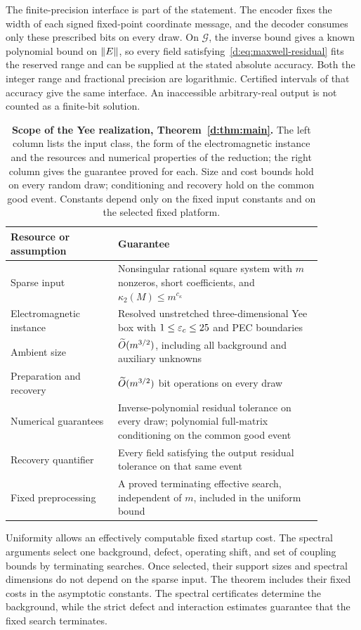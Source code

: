 The finite-precision interface is part of the statement. The encoder fixes
the width of each signed fixed-point coordinate message, and the decoder
consumes only these prescribed bits on every draw. On $\mathcal G$, the
inverse bound gives a known polynomial bound on $\left\lVert E\right\rVert$, so every
field satisfying~\eqref{d:eq:maxwell-residual} fits the reserved range and can be supplied at the stated
absolute accuracy. Both the integer range and fractional precision are
logarithmic. Certified intervals of that accuracy give the same interface.
An inaccessible arbitrary-real output is not counted as a finite-bit solution.

\begin{table}[tb]
\centering
\caption{\textbf{Scope of the Yee realization, Theorem~\ref{d:thm:main}.} The
left column lists the input class, the form of the electromagnetic instance
and the resources and numerical properties of the reduction; the right column
gives the guarantee proved for each. Size and cost bounds hold on every random
draw; conditioning and recovery hold on the common good event. Constants
depend only on the fixed input constants and on the selected fixed platform.}
\label{d:tab:resources}\small
\begin{tabular}{p{0.30\linewidth}p{0.58\linewidth}}
\toprule
Resource or assumption & Guarantee \\
\midrule
Sparse input & Nonsingular rational square system with $m$ nonzeros, short coefficients, and $\kappa_2(M)\le m^{c_\kappa}$ \\
Electromagnetic instance & Resolved unstretched three-dimensional Yee box with $1\le\varepsilon_c\le25$ and PEC boundaries \\
Ambient size & $\widetilde O(m^{3/2})$, including all background and auxiliary unknowns \\
Preparation and recovery & $\widetilde O(m^{3/2})$ bit operations on every draw \\
Numerical guarantees & Inverse-polynomial residual tolerance on every draw; polynomial full-matrix conditioning on the common good event \\
Recovery quantifier & Every field satisfying the output residual tolerance on that same event \\
Fixed preprocessing & A proved terminating effective search, independent of $m$, included in the uniform bound \\
\bottomrule
\end{tabular}
\end{table}

Uniformity allows an effectively computable fixed startup cost. The spectral arguments select one background, defect, operating shift, and set of coupling bounds by terminating searches. Once selected, their support sizes and spectral dimensions do not depend on the sparse input. The theorem includes their fixed costs in the asymptotic constants. The spectral certificates determine the background, while the strict defect and interaction estimates guarantee that the fixed search terminates.

